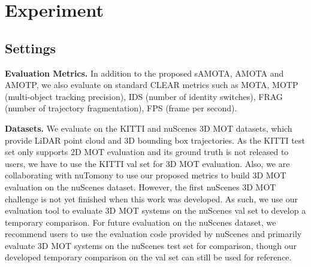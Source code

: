 \documentclass[letterpaper, 10 pt, conference]{ieeeconf}
\begin{document}
\begin{table}[t]
\caption{Performance over all categories on the nuScenes val set.}
\vspace{-0.25cm}
\centering
{}
\vspace{-0.7cm}
\label{tab:3dcomparison_nuscene}
\end{table}



\vspace{-0.1cm}
\section{Experiment}
\subsection{Settings}

\noindent\textbf{Evaluation Metrics.}\label{sec:metrics} In addition to the proposed sAMOTA, AMOTA and AMOTP, we also evaluate on standard CLEAR metrics such as MOTA, MOTP (multi-object tracking precision), IDS (number of identity switches), FRAG (number of trajectory fragmentation), FPS (frame per second).

\vspace{1.5mm}\noindent\textbf{Datasets.} We evaluate on the KITTI and nuScenes 3D MOT datasets, which provide LiDAR point cloud and 3D bounding box trajectories. As the KITTI test set only supports 2D MOT evaluation and its ground truth is not released to users, we have to use the KITTI val set for 3D MOT evaluation. Also, we are collaborating with nuTomony to use our proposed metrics to build 3D MOT evaluation on the nuScenes dataset. However, the first nuScenes 3D MOT challenge is not yet finished when this work was developed. As such, we use our evaluation tool to evaluate 3D MOT systems on the nuScenes val set to develop a temporary comparison. For future evaluation on the nuScenes dataset, we recommend users to use the evaluation code provided by nuScenes and primarily evaluate 3D MOT systems on the nuScenes test set for comparison, though our developed temporary comparison on the val set can still be used for reference. 
\end{document}
